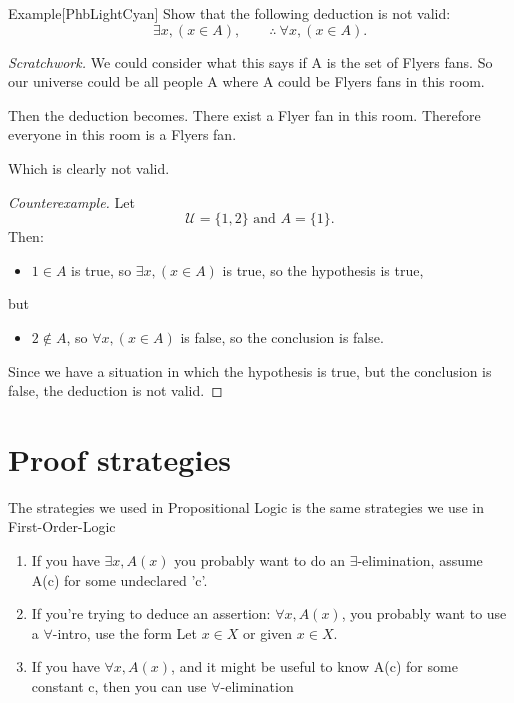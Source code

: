 \documentclass[../MATH-2000-Notes.tex]{subfiles}
\begin{document}
\begin{commentbox}{Example}[{PhbLightCyan}]
    Show that the following deduction is not valid:
    $$ \exists x, (x \in A), \qquad \therefore \ \forall x, (x \in A) .$$
\end{commentbox}
\textit{Scratchwork.} We could consider what this says if A is the set of Flyers fans. So our universe could be all people A where A could be Flyers fans in this room.

Then the deduction becomes. There exist a Flyer fan in this room. Therefore everyone in this room is a Flyers fan.

Which is clearly not valid.

\begin{proof}[Counterexample]
    Let
	$$ \text{$\mathcal{U} = \{1,2\}$ and $A = \{1\}$.} $$
    Then:
    \begin{itemize}
    \item[] $1 \in A$ is true, so $\exists x, (x \in A)$ is true,
    so the hypothesis is true, 
    \end{itemize}
    but
    \begin{itemize}
    \item[] $2 \notin A$, so $\forall x, (x \in A)$ is false, so the conclusion is false.
    \end{itemize}
    Since we have a situation in which the hypothesis is true, but the conclusion is false, the deduction is not valid.
\end{proof}


\section{Proof strategies}
The strategies  we used in Propositional Logic is the same strategies we use in First-Order-Logic
\begin{enumerate}
    \item If you have \(\exists x,A(x)\) you probably want to do an \(\exists\)-elimination, assume A(c) for some undeclared 'c'.
    \item If you're trying to deduce an assertion: \(\forall x, A(x)\), you probably want to use a \(\forall\)-intro, use the form Let \(x\in X\) or given \(x\in X\).
    \item If you have \(\forall x , A(x)\), and it might be useful to know A(c) for some constant c, then you can use \(\forall\)-elimination
\end{enumerate}
\end{document}
